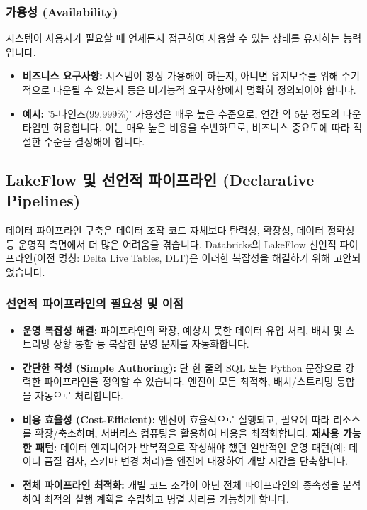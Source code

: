 \documentclass[11pt,a4paper]{article}
\theoremstyle{definition}
\begin{document}
\begin{enumerate}
\subsubsection{가용성 (Availability)}
\begin{conceptbox}
시스템이 사용자가 필요할 때 언제든지 접근하여 사용할 수 있는 상태를 유지하는 능력입니다.
\end{conceptbox}
\begin{itemize}
    \item \textbf{비즈니스 요구사항:} 시스템이 항상 가용해야 하는지, 아니면 유지보수를 위해 주기적으로 다운될 수 있는지 등은 비기능적 요구사항에서 명확히 정의되어야 합니다.
    \item \textbf{예시:} '5-나인즈(99.999\%)' 가용성은 매우 높은 수준으로, 연간 약 5분 정도의 다운타임만 허용합니다. 이는 매우 높은 비용을 수반하므로, 비즈니스 중요도에 따라 적절한 수준을 결정해야 합니다.
\end{itemize}

\subsection{LakeFlow 및 선언적 파이프라인 (Declarative Pipelines)}

데이터 파이프라인 구축은 데이터 조작 코드 자체보다 탄력성, 확장성, 데이터 정확성 등 운영적 측면에서 더 많은 어려움을 겪습니다. Databricks의 LakeFlow 선언적 파이프라인(이전 명칭: Delta Live Tables, DLT)은 이러한 복잡성을 해결하기 위해 고안되었습니다.

\subsubsection{선언적 파이프라인의 필요성 및 이점}
\begin{itemize}
    \item \textbf{운영 복잡성 해결:} 파이프라인의 확장, 예상치 못한 데이터 유입 처리, 배치 및 스트리밍 상황 통합 등 복잡한 운영 문제를 자동화합니다.
    \item \textbf{간단한 작성 (Simple Authoring):} 단 한 줄의 SQL 또는 Python 문장으로 강력한 파이프라인을 정의할 수 있습니다. 엔진이 모든 최적화, 배치/스트리밍 통합을 자동으로 처리합니다.
    \item \textbf{비용 효율성 (Cost-Efficient):} 엔진이 효율적으로 실행되고, 필요에 따라 리소스를 확장/축소하며, 서버리스 컴퓨팅을 활용하여 비용을 최적화합니다.
    \textbf{재사용 가능한 패턴:} 데이터 엔지니어가 반복적으로 작성해야 했던 일반적인 운영 패턴(예: 데이터 품질 검사, 스키마 변경 처리)을 엔진에 내장하여 개발 시간을 단축합니다.
    \item \textbf{전체 파이프라인 최적화:} 개별 코드 조각이 아닌 전체 파이프라인의 종속성을 분석하여 최적의 실행 계획을 수립하고 병렬 처리를 가능하게 합니다.
\end{itemize}


\end{enumerate}
\end{document}
